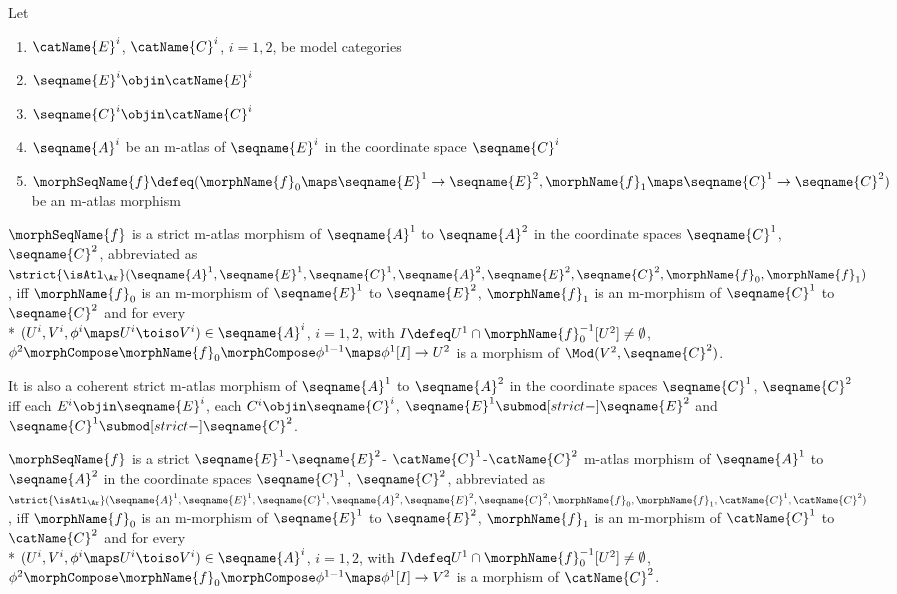 \documentclass{article}
\begin{document}
\begin{definition}
\label{def:M-ATLmorphstrict}
Let
\begin{enumerate}
\item
$\catName{E}^i$, $\catName{C}^i$, $i=1,2$, be model categories
\item
$\seqname{E}^i \objin \catName{E}^i$
\item
$\seqname{C}^i \objin \catName{C}^i$
\item
$\seqname{A}^i$ be an m-atlas of
$\seqname{E}^i$ in the coordinate space $\seqname{C}^i$
\item
$
  \morphSeqName{f} \defeq
  (
    \morphName{f}_0 \maps \seqname{E}^1 \to \seqname{E}^2,
    \morphName{f}_1 \maps \seqname{C}^1 \to \seqname{C}^2
  )
$
be an m-atlas morphism
\end{enumerate}

$\morphSeqName{f}$ is a strict 
m-atlas morphism of $\seqname{A}^1$ to $\seqname{A}^2$ in the
coordinate spaces $\seqname{C}^1$, $\seqname{C}^2$, abbreviated as
$
   \strict{\isAtl_\Ar}
   (
     \seqname{A}^1,
     \seqname{E}^1,
     \seqname{C}^1,
     \seqname{A}^2,
     \seqname{E}^2,
     \seqname{C}^2,
     \morphName{f}_0,
     \morphName{f}_1
   )
$,
iff $\morphName{f}_0$ is an m-morphism of $\seqname{E}^1$ to
$\seqname{E}^2$, $\morphName{f}_1$ is an m-morphism of
$\seqname{C}^1$ to $\seqname{C}^2$ and for every \\*
$(U^i, V^i, \phi^i \maps U^i \toiso V^i) \in \seqname{A}^i$, $i=1,2$,
with $I \defeq U^1 \cap \morphName{f}^{-1}_0[U^2] \neq \emptyset$,
$
   \phi^2 \morphCompose \morphName{f}_0 \morphCompose \phi^{1-1} \maps
   \phi^1[I] \to U^2
$
is a morphism of $\Mod(V^2,\seqname{C}^2)$.

It is also a coherent strict
m-atlas morphism of $\seqname{A}^1$ to $\seqname{A}^2$ in the
coordinate spaces $\seqname{C}^1$, $\seqname{C}^2$ iff
each $E^i \objin \seqname{E}^i$,
each $C^i \objin \seqname{C}^i$,
$\seqname{E}^1 \submod[strict-] \seqname{E}^2$ and
$\seqname{C}^1 \submod[strict-] \seqname{C}^2$.

$\morphSeqName{f}$ is a strict
\nobreaks
  {
    {$\seqname{E}^1$-$\seqname{E}^2$-}
    {$\catName{C}^1$-$\catName{C}^2$}
  }
m-atlas morphism of $\seqname{A}^1$ to $\seqname{A}^2$ in the coordinate
spaces $\seqname{C}^1$, $\seqname{C}^2$, abbreviated as
$
  \strict{\isAtl_\Ar}
  (
    \seqname{A}^1,
    \seqname{E}^1,
    \seqname{C}^1,
    \seqname{A}^2,
    \seqname{E}^2,
    \seqname{C}^2,
    \morphName{f}_0,
    \morphName{f}_1,
    \catName{C}^1,
    \catName{C}^2
  )
$,
iff $\morphName{f}_0$ is an m-morphism of $\seqname{E}^1$ to
$\seqname{E}^2$, $\morphName{f}_1$ is an m-morphism of
$\catName{C}^1$ to $\catName{C}^2$ and for every \\*
$(U^i,V^i, \phi^i \maps U^i \toiso V^i) \in \seqname{A}^i$, $i=1,2$,
with $I \defeq U^1 \cap \morphName{f}^{-1}_0[U^2] \neq \emptyset$,
$
  \phi^2 \morphCompose \morphName{f}_0 \morphCompose \phi^{1-1} \maps
  \phi^1[I] \to V^2
$
is a morphism of $\catName{C}^2$.


\end{definition}
\end{document}
